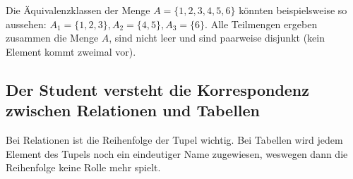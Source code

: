 Die Äquivalenzklassen der Menge $A=\{1, 2, 3, 4, 5, 6\}$ könnten beispielsweise so aussehen: $A_1=\{1, 2, 3\}, A_2=\{4, 5\}, A_3=\{6\}$. Alle Teilmengen ergeben zusammen die Menge $A$, sind nicht leer und sind paarweise disjunkt (kein Element kommt zweimal vor). 

\subsection{Der Student versteht die Korrespondenz zwischen Relationen und Tabellen}

Bei Relationen ist die Reihenfolge der Tupel wichtig. Bei Tabellen wird jedem Element des Tupels noch ein eindeutiger Name zugewiesen, weswegen dann die Reihenfolge keine Rolle mehr spielt.